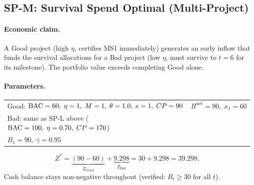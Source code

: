 \subsection{SP-M: Survival Spend Optimal (Multi-Project)}

\paragraph{Economic claim.}
A Good project (high $\eta$, certifies MS1 immediately) generates an
early inflow that funds the survival allocations for a Bad project
(low $\eta$, must survive to $t=6$ for its milestone). The portfolio
value exceeds completing Good alone.

\paragraph{Parameters.}
\begin{center}
\begin{tabular}{ll}
\toprule
Good: $\mathrm{BAC}=60,\;\eta=1,\;M=1,\;\theta=1.0,\;e=1,\;CP=90$ &
  $R^{\mathrm{net}}=90,\;x_1=60$\\
Bad: same as SP-L above ($\mathrm{BAC}=100,\;\eta=0.70,\;CP=170$) & \\
$B_1=90,\;\gamma=0.95$ & \\
\bottomrule
\end{tabular}
\end{center}
\[
  Z^* = \underbrace{(90-60)}_{Z_{\mathrm{Good}}}
      + \underbrace{9.298}_{Z_{\mathrm{Bad}}}
      = 30 + 9.298 = \mathbf{39.298}.
\]
Cash balance stays non-negative throughout (verified: $B_t\geq30$
for all $t$).


